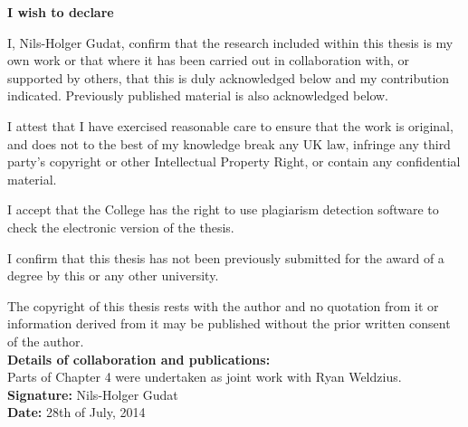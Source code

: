 
\begin{onehalfspacing}
\begin{declaration}      %

\thispagestyle{plain}

\textbf{I wish to declare}

I, Nils-Holger Gudat, confirm that the research included within this thesis is my own work or that where it has been carried out in collaboration with, or supported by others, that this is duly acknowledged below and my contribution indicated. Previously published material is also acknowledged below.

I attest that I have exercised reasonable care to ensure that the work is original, and does not to the best of my knowledge break any UK law, infringe any third party's copyright or other Intellectual Property Right, or contain any confidential material.

I accept that the College has the right to use plagiarism detection software to check the electronic version of the thesis.

I confirm that this thesis has not been previously submitted for the award of a degree by this or any other university.

The copyright of this thesis rests with the author and no quotation from it or information derived from it may be published without the prior written consent of the author.\\

\textbf{Details of collaboration and publications:}\\
Parts of Chapter 4 were undertaken as joint work with Ryan Weldzius.\\


\textbf{Signature:} Nils-Holger Gudat\\
\textbf{Date:} 28th of July, 2014


\end{declaration}
\end{onehalfspacing}
